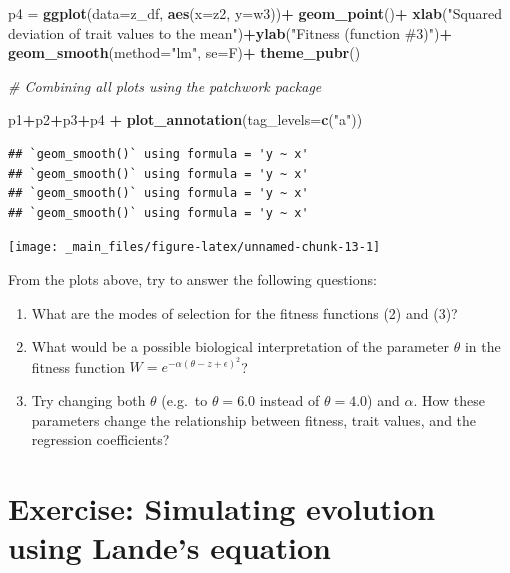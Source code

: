 \documentclass[
]{book}
\newenvironment{Shaded}{\begin{snugshade}}{\end{snugshade}}
\newcommand{\AttributeTok}[1]{\textcolor[rgb]{0.13,0.29,0.53}{#1}}
\newcommand{\CommentTok}[1]{\textcolor[rgb]{0.56,0.35,0.01}{\textit{#1}}}
\newcommand{\FunctionTok}[1]{\textcolor[rgb]{0.13,0.29,0.53}{\textbf{#1}}}
\newcommand{\NormalTok}[1]{#1}
\newcommand{\OtherTok}[1]{\textcolor[rgb]{0.56,0.35,0.01}{#1}}
\newcommand{\SpecialCharTok}[1]{\textcolor[rgb]{0.81,0.36,0.00}{\textbf{#1}}}
\newcommand{\StringTok}[1]{\textcolor[rgb]{0.31,0.60,0.02}{#1}}
\providecommand{\tightlist}{%
  \setlength{\itemsep}{0pt}\setlength{\parskip}{0pt}}
\begin{document}
\begin{Shaded}
\begin{Highlighting}[]
\NormalTok{p4 }\OtherTok{=} \FunctionTok{ggplot}\NormalTok{(}\AttributeTok{data=}\NormalTok{z\_df, }\FunctionTok{aes}\NormalTok{(}\AttributeTok{x=}\NormalTok{z2, }\AttributeTok{y=}\NormalTok{w3))}\SpecialCharTok{+}
  \FunctionTok{geom\_point}\NormalTok{()}\SpecialCharTok{+}
  \FunctionTok{xlab}\NormalTok{(}\StringTok{"Squared deviation of trait values to the mean"}\NormalTok{)}\SpecialCharTok{+}\FunctionTok{ylab}\NormalTok{(}\StringTok{"Fitness (function \#3)"}\NormalTok{)}\SpecialCharTok{+}
  \FunctionTok{geom\_smooth}\NormalTok{(}\AttributeTok{method=}\StringTok{"lm"}\NormalTok{, }\AttributeTok{se=}\NormalTok{F)}\SpecialCharTok{+}
  \FunctionTok{theme\_pubr}\NormalTok{()}

\CommentTok{\# Combining all plots using the patchwork package}

\NormalTok{p1}\SpecialCharTok{+}\NormalTok{p2}\SpecialCharTok{+}\NormalTok{p3}\SpecialCharTok{+}\NormalTok{p4 }\SpecialCharTok{+} \FunctionTok{plot\_annotation}\NormalTok{(}\AttributeTok{tag\_levels=}\FunctionTok{c}\NormalTok{(}\StringTok{"a"}\NormalTok{))}
\end{Highlighting}
\end{Shaded}

\begin{verbatim}
## `geom_smooth()` using formula = 'y ~ x'
## `geom_smooth()` using formula = 'y ~ x'
## `geom_smooth()` using formula = 'y ~ x'
## `geom_smooth()` using formula = 'y ~ x'
\end{verbatim}

\texttt{[image: \_main\_files/figure-latex/unnamed-chunk-13-1]}

From the plots above, try to answer the following questions:

\begin{enumerate}
\def\labelenumi{\arabic{enumi}.}
\tightlist
\item
  What are the modes of selection for the fitness functions (2) and (3)?
\item
  What would be a possible biological interpretation of the parameter \(\theta\) in the fitness function \(W=e^{-\alpha\left(\theta-z+\epsilon\right)^2}\)?
\item
  Try changing both \(\theta\) (e.g.~to \(\theta=6.0\) instead of \(\theta=4.0\)) and \(\alpha\). How these parameters change the relationship between fitness, trait values, and the regression coefficients?
\end{enumerate}

\hypertarget{exercise-simulating-evolution-using-landes-equation}{%
\chapter{Exercise: Simulating evolution using Lande's equation}\label{exercise-simulating-evolution-using-landes-equation}}
\end{document}
